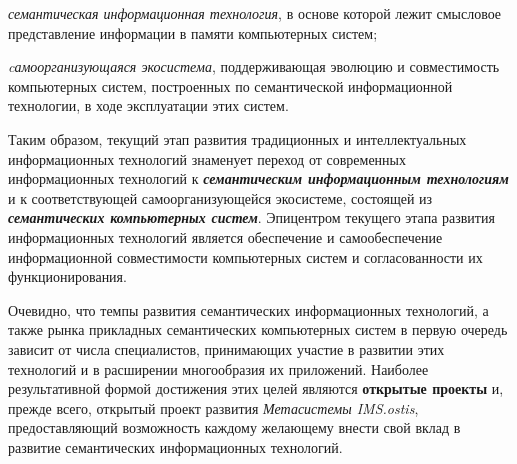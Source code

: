 \begin{SCn}
{\begin{scnitemize}
    \item \textit{семантическая информационная технология}, в основе которой лежит смысловое представление информации в памяти компьютерных систем;
    \item \textit{cамоорганизующаяся экосистема}, поддерживающая эволюцию и совместимость компьютерных систем, построенных по семантической информационной технологии, в ходе эксплуатации этих систем.
\end{scnitemize}

Таким образом, текущий этап развития традиционных и интеллектуальных информационных технологий знаменует переход от современных информационных технологий к \textit{\textbf{семантическим информационным технологиям}} и к соответствующей самоорганизующейся экосистеме, состоящей из \textit{\textbf{семантических компьютерных систем}}. Эпицентром текущего этапа развития информационных технологий является обеспечение и самообеспечение информационной совместимости компьютерных систем и согласованности их функционирования.

Очевидно, что темпы развития семантических информационных технологий, а также рынка прикладных семантических компьютерных систем в первую очередь зависит от числа специалистов, принимающих участие в развитии этих технологий и в расширении многообразия их приложений. Наиболее результативной формой достижения этих целей являются \textbf{открытые проекты} и, прежде всего, открытый проект развития \textit{Метасистемы IMS.ostis}, предоставляющий возможность каждому желающему внести свой вклад в развитие семантических информационных технологий.}

\scnendstruct

\end{SCn}